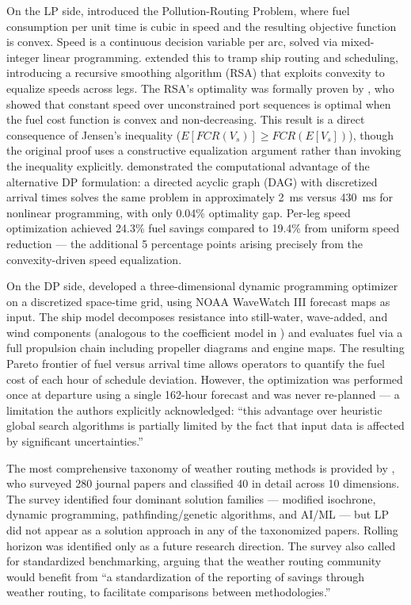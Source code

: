 \documentclass[review]{elsarticle}
\begin{document}
On the LP side, \cite{Bektas2011} introduced the Pollution-Routing Problem, where fuel consumption per unit time is cubic in speed and the resulting objective function is convex. Speed is a continuous decision variable per arc, solved via mixed-integer linear programming. \cite{Norstad2011} extended this to tramp ship routing and scheduling, introducing a recursive smoothing algorithm (RSA) that exploits convexity to equalize speeds across legs. The RSA's optimality was formally proven by \cite{Hvattum2013}, who showed that constant speed over unconstrained port sequences is optimal when the fuel cost function is convex and non-decreasing. This result is a direct consequence of Jensen's inequality ($E[FCR(V_s)] \geq FCR(E[V_s])$), though the original proof uses a constructive equalization argument rather than invoking the inequality explicitly. \cite{Fagerholt2010} demonstrated the computational advantage of the alternative DP formulation: a directed acyclic graph (DAG) with discretized arrival times solves the same problem in approximately 2~ms versus 430~ms for nonlinear programming, with only 0.04\% optimality gap. Per-leg speed optimization achieved 24.3\% fuel savings compared to 19.4\% from uniform speed reduction --- the additional 5 percentage points arising precisely from the convexity-driven speed equalization.

On the DP side, \cite{Zaccone2018} developed a three-dimensional dynamic programming optimizer on a discretized space-time grid, using NOAA WaveWatch III forecast maps as input. The ship model decomposes resistance into still-water, wave-added, and wind components (analogous to the coefficient model in \cite{Yang2020}) and evaluates fuel via a full propulsion chain including propeller diagrams and engine maps. The resulting Pareto frontier of fuel versus arrival time allows operators to quantify the fuel cost of each hour of schedule deviation. However, the optimization was performed once at departure using a single 162-hour forecast and was never re-planned --- a limitation the authors explicitly acknowledged: ``this advantage over heuristic global search algorithms is partially limited by the fact that input data is affected by significant uncertainties.''

The most comprehensive taxonomy of weather routing methods is provided by \cite{Zis2020}, who surveyed 280 journal papers and classified 40 in detail across 10 dimensions. The survey identified four dominant solution families --- modified isochrone, dynamic programming, pathfinding/genetic algorithms, and AI/ML --- but LP did not appear as a solution approach in any of the taxonomized papers. Rolling horizon was identified only as a future research direction. The survey also called for standardized benchmarking, arguing that the weather routing community would benefit from ``a standardization of the reporting of savings through weather routing, to facilitate comparisons between methodologies.''
\end{document}
